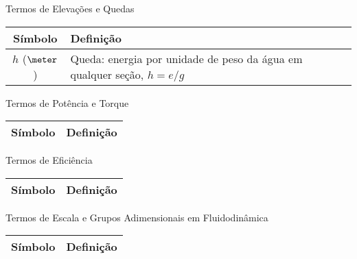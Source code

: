     \begin{frame}{Termos de Elevações e Quedas}\vspace*{-1em}
        \setlength{\tabcolsep}{2mm}
        \noindent\begin{longtable}{cp{110mm}}
            \alert{Símbolo} & \alert{Definição} \\
            \hline
            $h$ ($\meter$) &
            Queda: energia por unidade de peso da água em qualquer seção, \alert{$h = e/g$} \\
            \hline
        \end{longtable}
    \end{frame}

    \begin{frame}{Termos de Potência e Torque}\vspace*{-1em}
        \setlength{\tabcolsep}{2mm}
        \noindent\begin{longtable}{cp{110mm}}
            \alert{Símbolo} & \alert{Definição} \\
            \hline
            \hline
        \end{longtable}
    \end{frame}

    \begin{frame}{Termos de Eficiência}\vspace*{-1em}
        \setlength{\tabcolsep}{2mm}
        \noindent\begin{longtable}{cp{110mm}}
            \alert{Símbolo} & \alert{Definição} \\
            \hline
            \hline
        \end{longtable}
    \end{frame}

    \begin{frame}{Termos de Escala e Grupos Adimensionais em Fluidodinâmica}\vspace*{-1em}
        \setlength{\tabcolsep}{2mm}
        \noindent\begin{longtable}{cp{110mm}}
            \alert{Símbolo} & \alert{Definição} \\
            \hline
            \hline
        \end{longtable}
    \end{frame}

